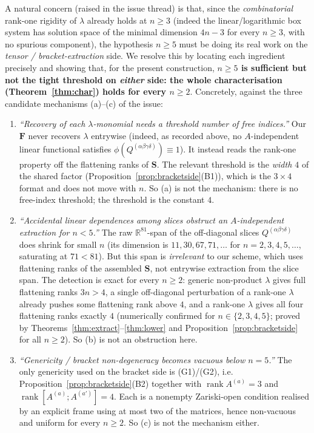 \begin{remark}\label{rem:threshold}
A natural concern (raised in the issue thread) is that, since the \emph{combinatorial}
rank-one rigidity of $\lambda$ already holds at $n\ge3$ (indeed the linear/logarithmic box
system has solution space of the minimal dimension $4n-3$ for every $n\ge3$, with no spurious
component), the hypothesis $n\ge5$ must be doing its real work on the
\emph{tensor / bracket-extraction} side. We resolve this by locating each ingredient
precisely and showing that, for the present construction, \textbf{$n\ge5$ is sufficient but
not the tight threshold on \emph{either} side: the whole characterisation
(Theorem~\ref{thm:char}) holds for every $n\ge2$}. Concretely, against the three candidate
mechanisms (a)--(c) of the issue:

\begin{enumerate}
\item[(a)] \emph{``Recovery of each $\lambda$-monomial needs a threshold number of free
indices.''} Our $\mathbf F$ never recovers $\lambda$ entrywise (indeed, as recorded above,
no $A$-independent linear functional satisfies $\phi(Q^{(\alpha\beta\gamma\delta)})\equiv1$).
It instead reads the rank-one property off the flattening ranks of $\mathbf S$. The relevant
threshold is the \emph{width $4$} of the shared factor (Proposition~\ref{prop:bracketside}(B1)),
which is the $3\times4$ format and does not move with $n$. So (a) is not the mechanism: there
is no free-index threshold; the threshold is the constant $4$.
\item[(b)] \emph{``Accidental linear dependences among slices obstruct an $A$-independent
extraction for $n<5$.''} The raw $\mathbb R^{81}$-span of the off-diagonal slices
$Q^{(\alpha\beta\gamma\delta)}$ does shrink for small $n$ (its dimension is
$11,30,67,71,\dots$ for $n=2,3,4,5,\dots$, saturating at $71<81$). But this span is
\emph{irrelevant} to our scheme, which uses flattening ranks of the assembled $\mathbf S$,
not entrywise extraction from the slice span. The detection is exact for every $n\ge2$:
generic non-product $\lambda$ gives full flattening ranks $3n>4$, a single off-diagonal
perturbation of a rank-one $\lambda$ already pushes some flattening rank above $4$, and a
rank-one $\lambda$ gives all four flattening ranks exactly $4$ (numerically confirmed for
$n\in\{2,3,4,5\}$; proved by Theorems~\ref{thm:extract}--\ref{thm:lower} and
Proposition~\ref{prop:bracketside} for all $n\ge2$). So (b) is not an obstruction here.
\item[(c)] \emph{``Genericity / bracket non-degeneracy becomes vacuous below $n=5$.''}
The only genericity used on the bracket side is (G1)/(G2), i.e.
Proposition~\ref{prop:bracketside}(B2) together with
$\operatorname{rank}A^{(a)}=3$ and $\operatorname{rank}[A^{(a)};A^{(a')}]=4$. Each is a
nonempty Zariski-open condition realised by an explicit frame using at most two of the
matrices, hence non-vacuous and uniform for every $n\ge2$. So (c) is not the mechanism
either.
\end{enumerate}


\end{remark}

